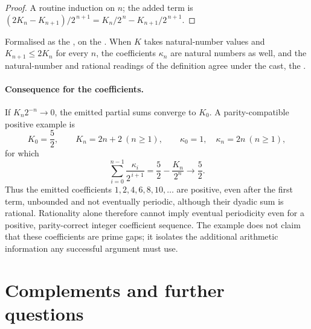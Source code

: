 \documentclass[11pt]{article}
\begin{document}
\begin{proof}
A routine induction on $n$; the added term is
$(2K_n-K_{n+1})/2^{\,n+1}=K_n/2^{\,n}-K_{n+1}/2^{\,n+1}$.
\end{proof}

\noindent Formalised as the
, on the
.  When $K$ takes natural-number values and $K_{n+1}\le2K_n$ for every $n$,
the coefficients $\kappa_n$ are natural numbers as well, and the
natural-number and rational readings of the definition agree under the cast,
the
.

\paragraph{Consequence for the coefficients.}
If $K_n2^{-n}\to0$, the emitted partial sums converge to $K_0$.  A
parity-compatible positive example is
\[
 K_0=\frac52,\qquad K_n=2n+2\ (n\ge1),\qquad
 \kappa_0=1,\quad\kappa_n=2n\ (n\ge1),
\]
for which
\[
 \sum_{i=0}^{n-1}\frac{\kappa_i}{2^{\,i+1}}
   =\frac52-\frac{K_n}{2^n}\longrightarrow\frac52.
\]
Thus the emitted coefficients $1,2,4,6,8,10,\ldots$ are positive, even after
the first term, unbounded and not eventually periodic, although their dyadic
sum is rational.  Rationality alone therefore cannot imply eventual
periodicity even for a positive, parity-correct integer coefficient sequence.
The example does not claim that these coefficients are prime gaps; it isolates
the additional arithmetic information any successful argument must use.

\section{Complements and further questions}\label{sec:open}
\end{document}
